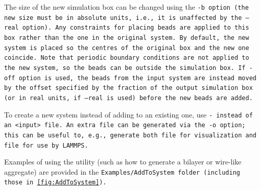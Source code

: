The size of the new simulation box can be changed using the \tt{-b} option (the
new size must be in absolute units, i.e., it is unaffected by the \tt{--real}
option). Any constraints for placing beads are applied to this box rather than
the one in the original system. By default, the new system is placed so the
centres of the original box and the new one coincide. Note that periodic
boundary conditions are not applied to the new system, so the beads can be
outside the simulation box. If \tt{-off} option is used, the beads from the
input system are instead moved by the offset specified by the fraction of the
output simulation box (or in real units, if \tt{--real} is used) before the new
beads are added.

To create a new system instead of adding to an existing one, use \tt{-} instead
of an \tt{<input>} file. An extra file can be generated via the \tt{-o} option;
this can be useful to, e.g., generate both \vtf file for visualization and \data
file for use by LAMMPS.

Examples of using the utility (such as how to generate a bilayer or wire-like
aggregate) are provided in the \tt{Examples/AddToSystem} folder (including those
in \cref{fig:AddToSystem}).

